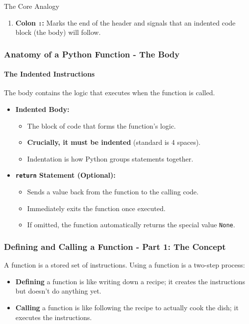\documentclass{beamer}
\begin{document}
\begin{frame}[fragile]
\begin{block}{The Core Analogy}
\begin{frame}[fragile]
\begin{enumerate}
        \item \textbf{Colon \texttt{:}:} Marks the end of the header and signals that an indented code block (the body) will follow.
    \end{enumerate}
    
\end{frame}

\begin{frame}[fragile]
    \frametitle{Anatomy of a Python Function - The Body}
    \framesubtitle{The Indented Instructions}
    
    The body contains the logic that executes when the function is called.
    
    \begin{itemize}
        \item \textbf{Indented Body:}
        \begin{itemize}
            \item The block of code that forms the function's logic.
            \item \textbf{Crucially, it must be indented} (standard is 4 spaces).
            \item Indentation is how Python groups statements together.
        \end{itemize}
        \bigskip %
        
        \item \textbf{\texttt{return} Statement (Optional):}
        \begin{itemize}
            \item Sends a value back from the function to the calling code.
            \item Immediately exits the function once executed.
            \item If omitted, the function automatically returns the special value \texttt{None}.
        \end{itemize}
    \end{itemize}
    
\end{frame}

\begin{frame}[fragile]
    \frametitle{Defining and Calling a Function - Part 1: The Concept}

    A function is a stored set of instructions. Using a function is a two-step process:
    \begin{itemize}
        \item \textbf{Defining} a function is like writing down a recipe; it creates the instructions but doesn't do anything yet.
        \item \textbf{Calling} a function is like following the recipe to actually cook the dish; it executes the instructions.
    \end{itemize}


\end{frame}
\end{block}
\end{frame}
\end{document}
